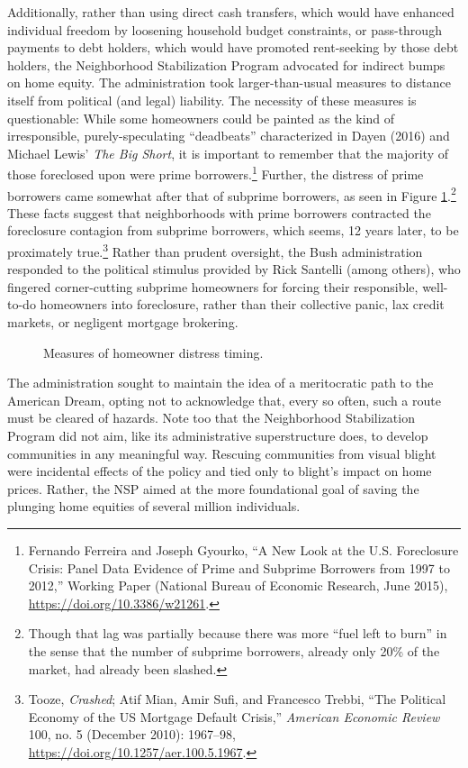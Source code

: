 \documentclass[12pt,oneside]{psthesis}
\begin{document}
Additionally, rather than using direct cash transfers, which would have enhanced individual freedom by loosening household budget constraints, or pass-through payments to debt holders, which would have promoted rent-seeking by those debt holders, the Neighborhood Stabilization Program advocated for indirect bumps on home equity.
The administration took larger-than-usual measures to distance itself from political (and legal) liability.
The necessity of these measures is questionable:
While some homeowners could be painted as the kind of irresponsible, purely-speculating ``deadbeats'' characterized in Dayen (2016) and Michael Lewis' \emph{The Big Short}, it is important to remember that the majority of those foreclosed upon were prime borrowers.\footnote{Fernando Ferreira and Joseph Gyourko, ``A New Look at the U.S. Foreclosure Crisis: Panel Data Evidence of Prime and Subprime Borrowers from 1997 to 2012,'' Working Paper (National Bureau of Economic Research, June 2015), \url{https://doi.org/10.3386/w21261}.}
Further, the distress of prime borrowers came somewhat after that of subprime borrowers, as seen in Figure \ref{fig:distress}.\footnote{Though that lag was partially because there was more ``fuel left to burn'' in the sense that the number of subprime borrowers, already only 20\% of the market, had already been slashed.}
These facts suggest that neighborhoods with prime borrowers contracted the foreclosure contagion from subprime borrowers, which seems, 12 years later, to be proximately true.\footnote{Tooze, \emph{Crashed}; Atif Mian, Amir Sufi, and Francesco Trebbi, ``The Political Economy of the US Mortgage Default Crisis,'' \emph{American Economic Review} 100, no. 5 (December 2010): 1967--98, \url{https://doi.org/10.1257/aer.100.5.1967}.}
Rather than prudent oversight, the Bush administration responded to the political stimulus provided by Rick Santelli (among others), who fingered corner-cutting subprime homeowners for forcing their responsible, well-to-do homeowners into foreclosure, rather than their collective panic, lax credit markets, or negligent mortgage brokering.
\begin{figure}

{\centering {}

}

\caption{Measures of homeowner distress timing.}\label{fig:distress}
\end{figure}
The administration sought to maintain the idea of a meritocratic path to the American Dream, opting not to acknowledge that, every so often, such a route must be cleared of hazards.
Note too that the Neighborhood Stabilization Program did not aim, like its administrative superstructure does, to develop communities in any meaningful way.
Rescuing communities from visual blight were incidental effects of the policy and tied only to blight's impact on home prices.
Rather, the NSP aimed at the more foundational goal of saving the plunging home equities of several million individuals.
\end{document}
